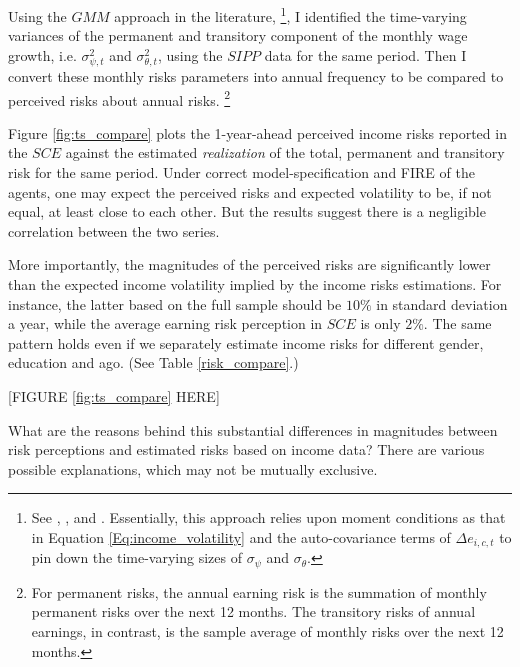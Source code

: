 Using the $GMM$ approach in the literature, \footnote{See \cite{carroll1997nature}, \cite{meghir2004income}, and \cite{blundell_consumption_2008}. Essentially, this approach relies upon moment conditions as that in Equation \ref{Eq:income_volatility} and the auto-covariance terms of $\Delta e_{i,c,t}$ to pin down the time-varying sizes of $\sigma_{\psi}$ and $\sigma_{\theta}$.}, I identified the time-varying variances of the permanent and transitory component of the monthly wage growth, i.e. $\sigma^2_{\psi,t}$ and $\sigma^2_{\theta,t}$, using the $SIPP$ data for the same period. Then I convert these monthly risks parameters into annual frequency to be compared to perceived risks about annual risks. \footnote{For permanent risks, the annual earning risk is the summation of monthly permanent risks over the next 12 months. The transitory risks of annual earnings, in contrast, is the sample average of monthly risks over the next 12 months.}


Figure \ref{fig:ts_compare} plots the 1-year-ahead perceived income risks reported in the $SCE$ against the estimated \emph{realization} of the total, permanent and transitory risk for the same period. Under correct model-specification and FIRE of the agents, one may expect the perceived risks and expected volatility to be, if not equal, at least close to each other. But the results suggest there is a negligible correlation between the two series. 

More importantly, the magnitudes of the perceived risks are significantly lower than the expected income volatility implied by the income risks estimations. For instance, the latter based on the full sample should be $10\%$ in standard deviation a year, while the average earning risk perception in $SCE$ is only $2\%$. The same pattern holds even if we separately estimate income risks for different gender, education and ago. (See Table \ref{risk_compare}.)

\begin{center}
[FIGURE \ref{fig:ts_compare} HERE]
\end{center}


What are the reasons behind this substantial differences in magnitudes between risk perceptions and estimated risks based on income data? There are various possible explanations, which may not be mutually exclusive. 

